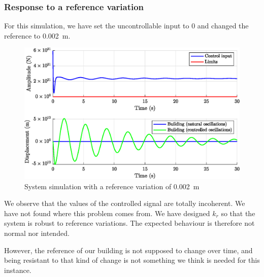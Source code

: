 \subsubsection{Response to a reference variation}
For this simulation, we have set the uncontrollable input to 0 and changed the reference to \SI{0.002}{\meter}.
\begin{figure}[H]
    \centering
    \includegraphics[width=\textwidth]{resources/eps/3_reference.eps}
    \caption{System simulation with a reference variation of \SI{0.002}{\meter}}
\end{figure}
We observe that the values of the controlled signal are totally incoherent. We have not found where this problem comes from. We have designed $k_r$ so that the system is robust to reference variations. The expected behaviour is therefore not normal nor intended.\par
However, the reference of our building is not supposed to change over time, and being resistant to that kind of change is not something we think is needed for this instance.

